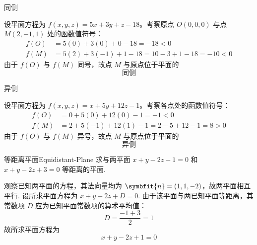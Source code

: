 \begin{solution}
     同侧

    设平面方程为 $f(x, y, z) = 5x + 3y + z - 18$。考察原点 $O(0, 0, 0)$ 与点 $M(2, -1, 1)$ 处的函数值符号：
    \begin{equation}
        \begin{aligned}
            f(O) & = 5(0) + 3(0) + 0 - 18 = -18 < 0                    \\
            f(M) & = 5(2) + 3(-1) + 1 - 18 = 10 - 3 + 1 - 18 = -10 < 0
        \end{aligned}
    \end{equation}
    由于 $f(O)$ 与 $f(M)$ 同号，故点 $M$ 与原点位于平面的
    \begin{equation}
        \boxed{\text{同侧}}
    \end{equation}

     异侧

    设平面方程为 $f(x, y, z) = x + 5y + 12z - 1$。考察各点处的函数值符号：
    \begin{equation}
        \begin{aligned}
            f(O) & = 0 + 5(0) + 12(0) - 1 = -1 < 0                  \\
            f(M) & = 2 + 5(-1) + 12(1) - 1 = 2 - 5 + 12 - 1 = 8 > 0
        \end{aligned}
    \end{equation}
    由于 $f(O)$ 与 $f(M)$ 异号，故点 $M$ 与原点位于平面的
    \begin{equation}
        \boxed{\text{异侧}}
    \end{equation}
\end{solution}


\begin{problem}{等距离平面}{Equidistant-Plane}
    求与两平面 $x + y - 2z - 1 = 0$ 和 $x + y - 2z + 3 = 0$ 等距离的平面.
\end{problem}

\begin{solution}
    观察已知两平面的方程，其法向量均为 $\symbfit{n} = (1, 1, -2)$，故两平面相互平行.
    设所求平面方程为 $x + y - 2z + D = 0$.
    由于该平面与两已知平面等距离，其常数项 $D$ 应为已知平面常数项的算术平均值：
    \begin{equation}
        D = \frac{-1 + 3}{2} = 1
    \end{equation}
    故所求平面方程为
    \begin{equation}
        \boxed{x + y - 2z + 1 = 0}
    \end{equation}
\end{solution}

